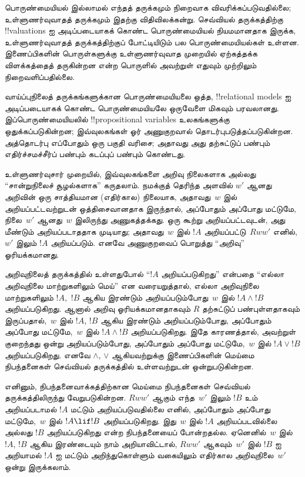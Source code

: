 \documentclass[../../../include/open-logic-section]{subfiles}
\begin{document}


பொருண்மையியல் இல்லாமல் எந்தத் தருக்கமும் நிறைவாக விவரிக்கப்படுவதில்லை;
உள்ளுணர்வுவாதத் தருக்கமும் இதற்கு விதிவிலக்கன்று. செவ்வியல் தருக்கத்திற்கு
!!{valuation}s ஐ அடிப்படையாகக் கொண்ட பொருண்மையியல் நியமமானதாக இருக்க,
உள்ளுணர்வுவாதத் தருக்கத்திற்குப் போட்டியிடும் பல பொருண்மையியல்கள் உள்ளன.
இணைப்பிகளின் பொருள்களுக்கு உள்ளுணர்வுவாத முறையில் ஏற்கத்தக்க விளக்கத்தைத்
தருகின்றன என்ற பொருளில் அவற்றுள் எதுவும் முற்றிலும் நிறைவளிப்பதில்லை.

வாய்ப்புநிலைத் தருக்கங்களுக்கான பொருண்மையியலை ஒத்த, !!{relational model}s ஐ
அடிப்படையாகக் கொண்ட பொருண்மையியலே ஒருவேளை மிகவும் பரவலானது. இப்பொருண்மையியலில்
!!{propositional variable}s உலகங்களுக்கு ஒதுக்கப்படுகின்றன; இவ்வுலகங்கள்
ஓர் அணுகுறவால் தொடர்புபடுத்தப்படுகின்றன. அத்தொடர்பு எப்போதும் ஒரு பகுதி
வரிசை; அதாவது அது தற்சுட்டுப் பண்பும் எதிர்ச்சமச்சீர்ப் பண்பும் கடப்புப்
பண்பும் கொண்டது.

உள்ளுணர்வுசார் முறையில், இவ்வுலகங்களை அறிவு நிலைகளாக அல்லது ``சான்றுநிலைச்
சூழல்களாக'' கருதலாம். நமக்குத் தெரிந்த அளவில் $w'$ ஆனது அறிவின் ஒரு
சாத்தியமான (எதிர்கால) நிலையாக, அதாவது~$w$ இல் அறியப்பட்டவற்றுடன்
ஒத்திசைவானதாக இருந்தால், அப்போதும் அப்போது மட்டுமே, நிலை~$w'$ ஆனது~$w$
இலிருந்து அணுகத்தக்கது. ஒரு கூற்று அறியப்பட்டவுடன், அது மீண்டும்
அறியப்படாததாக முடியாது; அதாவது~$w$ இல் $!A$ அறியப்பட்டு~$Rww'$ எனில்,
$w'$ இலும் $!A$ அறியப்படும். எனவே அணுகுறவைப் பொறுத்து ``அறிவு''
ஓரியக்கமானது.

அறிவுநிலைத் தருக்கத்தில் உள்ளதுபோல் ``$!A$ அறியப்படுகிறது'' என்பதை
``எல்லா அறிவுநிலை மாற்றுகளிலும் மெய்'' என வரையறுத்தால், எல்லா அறிவுநிலை
மாற்றுகளிலும் $!A$,~$!B$ ஆகிய இரண்டும் அறியப்படும்போது~$w$ இல் $!A \land
!B$ அறியப்படுகிறது. ஆனால் அறிவு ஓரியக்கமானதாகவும் $R$ தற்சுட்டுப்
பண்புள்ளதாகவும் இருப்பதால்,~$w$ இல் $!A$, $!B$ ஆகிய இரண்டும்
அறியப்படும்போது, அப்போதும் அப்போது மட்டுமே,~$w$ இல் $!A \land !B$
அறியப்படுகிறது. இதே காரணத்தால், அவற்றுள் குறைந்தது ஒன்று அறியப்படும்போது,
அப்போதும் அப்போது மட்டுமே,~$w$ இல் $!A \lor !B$ அறியப்படுகிறது. எனவே
$\land$, $\lor$ ஆகியவற்றுக்கு இணைப்பிகளின் மெய்மை நிபந்தனைகள் செவ்வியல்
தருக்கத்தில் உள்ளவற்றுடன் ஒன்றுபடுகின்றன.

எனினும், நிபந்தனைவாக்கத்திற்கான மெய்மை நிபந்தனைகள் செவ்வியல்
தருக்கத்திலிருந்து வேறுபடுகின்றன. $Rww'$ ஆகும் எந்த~$w'$ இலும் $!B$ உம்
அறியப்படாமல் $!A$ மட்டும் அறியப்படுவதில்லை எனில், அப்போதும் அப்போது
மட்டுமே,~$w$ இல் $!A \lif !B$ அறியப்படுகிறது. இது~$w$ இல் $!A$
அறியப்படவில்லை அல்லது $!B$ அறியப்படுகிறது என்ற நிபந்தனையைப் போன்றதல்ல.
ஏனெனில்~$w$ இல் $!A$, $!B$ ஆகிய இரண்டையும் நாம் அறியாவிட்டால், $Rww'$
ஆகவும்~$w'$ இல் $!B$ ஐ அறியாமல் $!A$ ஐ மட்டும் அறிந்துகொள்ளும் வகையிலும்
எதிர்கால அறிவுநிலை~$w'$ ஒன்று இருக்கலாம்.
\end{document}
